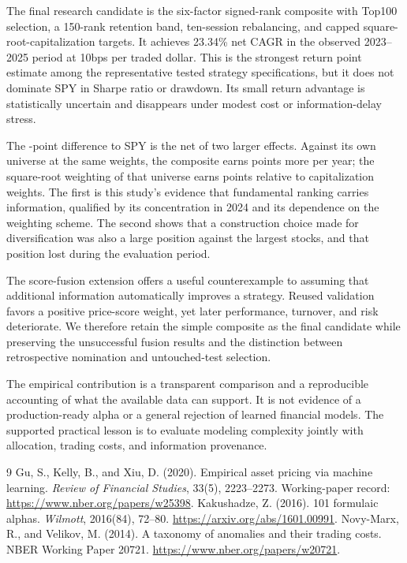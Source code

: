 \documentclass[11pt]{article}
\begin{document}
The final research candidate is the six-factor signed-rank composite with Top100 selection, a 150-rank retention band, ten-session rebalancing, and capped square-root-capitalization targets. It achieves 23.34\% net CAGR in the observed 2023--2025 period at 10bps per traded dollar. This is the strongest return point estimate among the representative tested strategy specifications, but it does not dominate SPY in Sharpe ratio or drawdown. Its small return advantage is statistically uncertain and disappears under modest cost or information-delay stress.

The \attrTot{}-point difference to SPY is the net of two larger effects. Against its own universe at the same weights, the composite earns \attrSel{} points more per year; the square-root weighting of that universe earns \attrWgt{} points relative to capitalization weights. The first is this study's evidence that fundamental ranking carries information, qualified by its concentration in 2024 and its dependence on the weighting scheme. The second shows that a construction choice made for diversification was also a large position against the largest stocks, and that position lost during the evaluation period.

The score-fusion extension offers a useful counterexample to assuming that additional information automatically improves a strategy. Reused validation favors a positive price-score weight, yet later performance, turnover, and risk deteriorate. We therefore retain the simple composite as the final candidate while preserving the unsuccessful fusion results and the distinction between retrospective nomination and untouched-test selection.

The empirical contribution is a transparent comparison and a reproducible accounting of what the available data can support. It is not evidence of a production-ready alpha or a general rejection of learned financial models. The supported practical lesson is to evaluate modeling complexity jointly with allocation, trading costs, and information provenance.

\begin{thebibliography}{9}
 Gu, S., Kelly, B., and Xiu, D. (2020). Empirical asset pricing via machine learning. \emph{Review of Financial Studies}, 33(5), 2223--2273. Working-paper record: \url{https://www.nber.org/papers/w25398}.
 Kakushadze, Z. (2016). 101 formulaic alphas. \emph{Wilmott}, 2016(84), 72--80. \url{https://arxiv.org/abs/1601.00991}.
 Novy-Marx, R., and Velikov, M. (2014). A taxonomy of anomalies and their trading costs. NBER Working Paper 20721. \url{https://www.nber.org/papers/w20721}.
\end{thebibliography}
\clearpage
\end{document}
